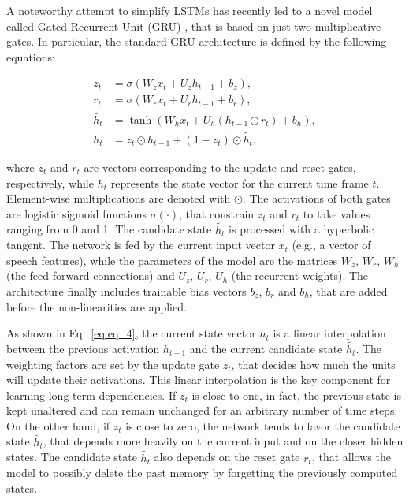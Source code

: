 \documentclass[journal]{IEEEtran}
\begin{document}
A noteworthy attempt to simplify LSTMs has recently led to a novel model called Gated Recurrent Unit (GRU) \cite{gru1,gru2}, that is based on just two multiplicative gates. %
In particular, the standard GRU architecture is defined by the following equations: 

\begin{subequations}
\begin{align}
z_{t}&=\sigma(W_{z}x_{t}+U_{z}h_{t-1}+b_{z}), \\
\label{eq:eq_2}r_{t}&=\sigma(W_{r}x_{t}+U_{r}h_{t-1}+b_{r}), \\
\label{eq:eq_3}\widetilde{h_{t}}&=\tanh(W_{h}x_{t}+U_{h}(h_{t-1} \odot r_{t})+b_{h}), \\
\label{eq:eq_4}h_{t}&=z_{t} \odot h_{t-1}+ (1-z_{t}) \odot \widetilde{h_{t}}.
\end{align}
\end{subequations}

where $z_{t}$ and $r_{t}$ are vectors corresponding to the update and reset gates, respectively, while $h_{t}$ represents the state vector for the current time frame $t$.
Element-wise multiplications are denoted with $\odot$.
The activations of both gates are logistic sigmoid functions $\sigma(\cdot)$, that constrain $z_{t}$ and $r_{t}$ to take values ranging from 0 and 1. The candidate state $\widetilde{h_{t}}$ is processed with a hyperbolic tangent. 
The network is fed by the current input vector $x_{t}$ (e.g., a vector of speech features), while the parameters of the model are the matrices $W_z$, $W_r$, $W_h$ (the feed-forward connections) and $U_z$, $U_r$, $U_h$ (the recurrent weights).
The architecture finally includes trainable bias vectors $b_z$, $b_r$ and $b_h$, that are added before the non-linearities are applied. 

As shown in Eq.~\ref{eq:eq_4}, the current state vector $h_{t}$ is a linear interpolation between the previous activation $h_{t-1}$ and the current candidate state $\widetilde{h_{t}}$. The weighting factors are set by the update gate $z_{t}$, that decides how much the units will update their activations. This linear interpolation is the key component for learning long-term dependencies. If $z_{t}$ is close to one, in fact, the previous state is kept unaltered and can remain unchanged for an arbitrary number of time steps. On the other hand, if $z_{t}$ is close to zero, the network tends to favor the candidate state $\widetilde{h_{t}}$, that depends more heavily on the current input and on the closer hidden states. The candidate state $\widetilde{h_{t}}$ also depends on the reset gate $r_{t}$, that allows the model to possibly delete the past memory by forgetting the previously computed states.
\end{document}
